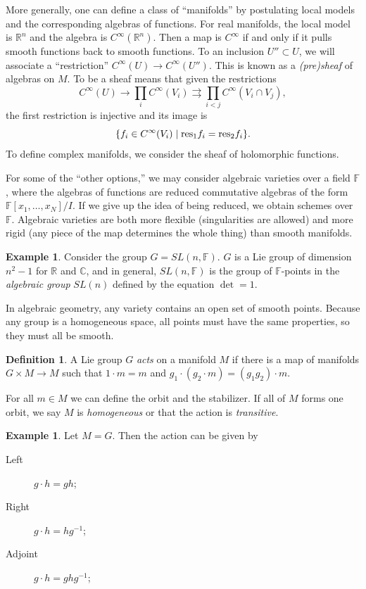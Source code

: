 \documentclass[leqno, openany]{memoir}
\theoremstyle{definition}
\newtheorem{defn}[thm]{Definition}
\newtheorem{exm}[thm]{Example}
\theoremstyle{remark}
\theoremstyle{plain}
\theoremstyle{definition}
\theoremstyle{remark}
\newcommand{\F}{\mathbb{F}}
\newcommand{\R}{\mathbb{R}}
\newcommand{\C}{\mathbb{C}}
\newcommand{\mr}[1]{\mathrm{#1}}
\begin{document}
More generally, one can define a class of ``manifolds'' by postulating local
models and the corresponding algebras of functions. For real manifolds, the
local model is $\R^n$ and the algebra is $C^{\infty}(\R^n)$. Then a map is
$C^{\infty}$ if and only if it pulls smooth functions back to smooth functions.
To an inclusion $U'' \subset U$, we will associate a ``restriction''
$C^{\infty}(U) \to C^{\infty}(U'')$. This is known as a \textit{(pre)sheaf} of
algebras on $M$. To be a sheaf means that given the restrictions \[
C^{\infty}(U) \to \prod_i C^{\infty}(V_i) \rightrightarrows \prod_{i<j}
C^{\infty}(V_i \cap V_j), \] the first restriction is injective and its image
is \[ \qty{ f_i \in C^{\infty}(V_i) \mid \mr{res}_1 f_i = \mr{res}_2 f_i }. \]
To define complex manifolds, we consider the sheaf of holomorphic functions.

For some of the ``other options,'' we may consider algebraic varieties over a
field $\mathbb{F}$, where the algebras of functions are reduced commutative
algebras of the form $\mathbb{F}[x_1, \ldots, x_N] / I$. If we give up the idea
of being reduced, we obtain schemes over $\mathbb{F}$. Algebraic varieties are
both more flexible (singularities are allowed) and more rigid (any piece of the
map determines the whole thing) than smooth manifolds.

\begin{exm} Consider the group $G = SL(n,\F)$. $G$ is a Lie group of dimension
$n^2-1$ for $\R$ and $\C$, and in general, $SL(n,\F)$ is the group of
$\F$-points in the \textit{algebraic group} $SL(n)$ defined by the equation
$\det = 1$.  \end{exm}

In algebraic geometry, any variety contains an open set of smooth points.
Because any group is a homogeneous space, all points must have the same
properties, so they must all be smooth.

\begin{defn} A Lie group $G$ \textit{acts} on a manifold $M$ if there is a map
    of manifolds $G \times M \to M$ such that $1 \cdot m = m$ and $g_1 \cdot
    (g_2 \cdot m) = (g_1g_2) \cdot m$.

    For all $m \in M$ we can define the orbit and the stabilizer. If all of $M$
forms one orbit, we say $M$ is \textit{homogeneous} or that the action is
\textit{transitive}.  \end{defn}

\begin{exm} Let $M = G$. Then the action can be given by \begin{description}
\item[Left] $g \cdot h = gh$; \item[Right] $g \cdot h = hg^{-1}$;
\item[Adjoint] $g \cdot h = g h g^{-1}$; \end{description} \end{exm}
\end{document}
